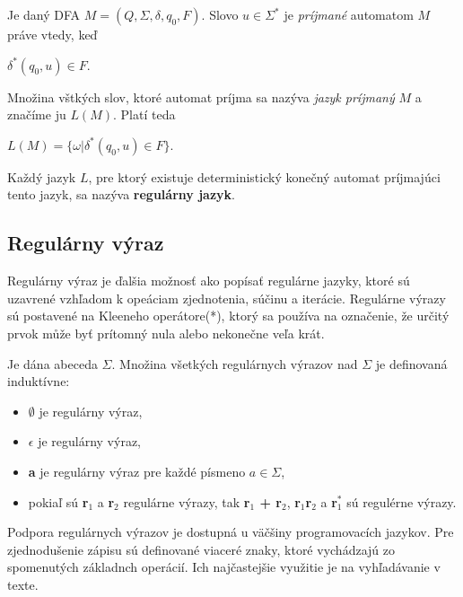 \begin{definice}
Je daný DFA $M = (Q,\Sigma,\delta, q_0, F)$. Slovo $u \in \Sigma^*$ je \textit{príjmané} automatom $M$ práve vtedy, keď
\begin{center}
$\delta^*(q_0,u) \in F$.
\end{center}
Množina vštkých slov, ktoré automat príjma sa nazýva \textit{jazyk príjmaný} $M$ a značíme ju $L(M)$. Platí teda
\begin{center}
$L(M) = \{\omega|\delta^*(q_0,u) \in F\}$.\cite{demlova:automaty}
\end{center}
\end{definice}

Každý jazyk $L$, pre ktorý existuje deterministický konečný automat príjmajúci tento jazyk, sa nazýva \textbf{regulárny jazyk}.

\subsection{Regulárny výraz}\label{regexp}
Regulárny výraz je ďalšia možnosť ako popísať regulárne jazyky, ktoré sú uzavrené vzhľadom k opeáciam zjednotenia, súčinu a iterácie. Regulárne výrazy sú postavené na Kleeneho operátore(*), ktorý sa používa na označenie, že určitý prvok může byť prítomný nula alebo nekonečne veľa krát.
\begin{definice}
Je dána abeceda $\Sigma$. Množina všetkých regulárnych výrazov nad $\Sigma$ je definovaná induktívne:
\begin{itemize}
\item $\emptyset$ je regulárny výraz,
\item $\epsilon$ je regulárny výraz,
\item \textbf{a} je regulárny výraz pre každé písmeno $a \in \Sigma$,
\item pokiaľ sú \textbf{r$_1$} a \textbf{r$_2$} regulárne výrazy, tak \textbf{r$_1$ + r$_2$}, \textbf{r$_1$r$_2$} a \textbf{r$_1^*$} sú regulérne výrazy. \cite{demlova:automaty}
\end{itemize}
\end{definice}

Podpora regulárnych výrazov je dostupná u väčšiny programovacích jazykov. Pre zjednodušenie zápisu sú definované viaceré znaky, ktoré vychádzajú zo spomenutých základnch operácií. Ich najčastejšie využitie je na vyhľadávanie v texte.



